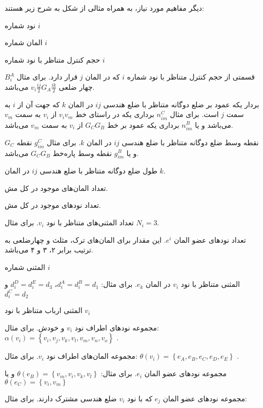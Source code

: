 دیگر مفاهیم مورد نیاز، به همراه مثالی از شکل  به شرح زیر هستند:  
\begin{tight_itemize}
\item[$v_i$]
نود شماره $i$
\item[$e_i$]
المان شماره $i$
\item[$B_i$]
حجم کنترل متناظر با نود شماره $i$  
\item[$B_i^j$]
قسمتی از حجم کنترل متناظر با نود شماره $i$ که در المان $j$ قرار دارد. برای مثال $B_i^A$ چهار ضلعی
$v_i\frac{ij}{2}G_A\frac{ik}{2}$
می‌باشد.  
\item[$n_{ij}^k$]
بردار یکه عمود بر ضلع دو‌گانه متناظر با ضلع هندسی $ij$ در المان $k$ که جهت آن از $i$ به سمت $j$ است. برای مثال 
$n_{im}^C$
برداری یکه در راستای خط $v_iv_m$ از $v_i$ به سمت $v_m$ می‌باشد و یا 
$n_{im}^B$
برداری یکه عمود بر خط $G_CG_B$ از $v_i$ به سمت $v_m$ می‌باشد. 
\item[$g_{ij}^k$]
نقطه وسط ضلع دو‌گانه متناظر با ضلع هندسی $ij$ در المان $k$. برای مثال  
$g_{im}^C$
نقطه $G_C$ و یا 
$g_{im}^B$
نقطه وسط پاره‌خط $G_CG_B$ می‌باشد.  
\item[$l_{ij}^k$]
طول ضلع دو‌گانه متناظر با ضلع هندسی $ij$ در المان $k$. 
\item[\lr{NE}]
تعداد المان‌های موجود در کل مش. 
\item[\lr{NV}]
تعداد نود‌های موجود در کل مش. 
\item[$N_i$]
تعداد المثنی‌های متناظر با نود $v_i$. برای مثال $N_i=3$. 
\item[$N^i$]
تعداد نود‌های عضو المان $e^i$. این مقدار برای المان‌های ترک، مثلث و چهارضلعی به ترتیب برابر ۲، ۳ و ۴ می‌باشد. 
\item[$d_i$]
المثنی شماره $i$
\item[$d_i^k$]
المثنی متناظر با نود $v_i$ در المان $e_k$. برای مثال:
$d_i^A=d_i^B=d_1$، $d_i^D=d_i^E=d_3$ و $d_i^C = d_2$ 
\item[$d_i^*$]
 المثنی ارباب متناظر با نود $v_i$ 
\item[$\alpha(v_i)$]
مجموعه نود‌های اطراف نود $v_i$ و خودش. برای مثال:
$\alpha(v_i) = \left\{ v_i, v_j, v_k, v_l, v_m, v_n, v_o \right\}$ .
\item[$\theta(v_i)$]
 مجموعه المان‌های اطراف نود $v_i$. برای مثال:
$\theta(v_i) = \left\{ e_A, e_B, e_C, e_D, e_E \right\}$ . 
\item[$\sigma(e_i)$]
 مجموعه نود‌های عضو المان $e_i$. برای مثال:
$\theta(e_B) = \left\{ v_m, v_i, v_k, v_l \right\}$ و یا $\theta(e_C) = \left\{ v_i, v_m \right\}$ 
\item[$\eta(v_i,e_j)$]
مجموعه نود‌های عضو المان $e_j$ که با نود $v_i$ ضلع هندسی مشترک دارند. برای مثال:\\

\end{tight_itemize}
